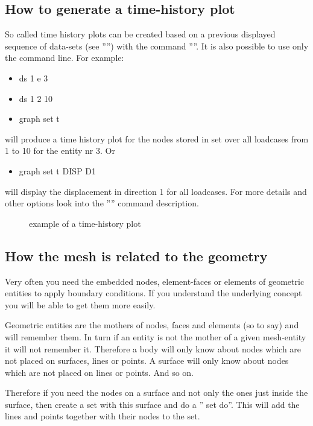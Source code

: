 \documentclass{article}
\begin{document}
\begin{appendix}
\subsection{\label{How to generate a time-history plot}How to generate a time-history plot}
So called time history plots can be created based on a previous displayed sequence of data-sets (see '''') with the command ''''. It is also possible to use only the command line. For example:
\begin{itemize}
\item ds 1 e 3
\item ds 1 2 10
\item graph set t
\end{itemize}
will produce a time history plot for the nodes stored in set over all loadcases from 1 to 10 for the entity nr 3.
Or
\begin{itemize}
\item graph set t DISP D1
\end{itemize}
will display the displacement in direction 1 for all loadcases.
For more details and other options look into the '''' command description.
\newpage

\begin{figure}[h]
\caption{\label{graph2D} example of a time-history plot }
\end{figure}


\subsection{\label{How the mesh is related to the geometry}How the mesh is related to the geometry}
Very often you need the embedded nodes, element-faces or elements of geometric entities to apply boundary conditions. If you understand the underlying concept you will be able to get them more easily.

Geometric entities are the mothers of nodes, faces and elements (so to say) and will remember them. In turn if an entity is not the mother of a given mesh-entity it will not remember it. Therefore a body will only know about nodes which are not placed on surfaces, lines or points. A surface will only know about nodes which are not placed on lines or points. And so on.

Therefore if you need the nodes on a surface and not only the ones just inside the surface, then create a set with this surface and do a '' set do''. This will add the lines and points together with their nodes to the set.


\end{appendix}
\end{document}
